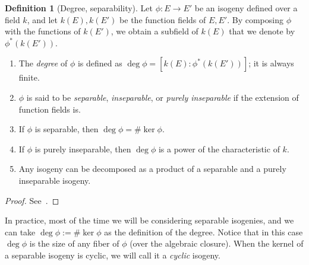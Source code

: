 \documentclass[10pt]{article}
\theoremstyle{plain}
\theoremstyle{definition}
\newtheorem{definition}[theorem]{Definition}
\begin{document}
\begin{definition}[Degree, separability]\label{def:degsep}
  Let $ϕ:E\to E'$ be an isogeny defined over a field $k$, and let
  $k(E),k(E')$ be the function fields of $E,E'$. %
  By composing $\phi$ with the functions of $k(E')$, we obtain a
  subfield of $k(E)$ that we denote by $ϕ^\ast(k(E'))$.

  \begin{enumerate}
  \item The \emph{degree} of $ϕ$ is defined as
    $\deg ϕ = [k(E):ϕ^\ast(k(E'))]$; it is always finite.
  \item $ϕ$ is said to be \emph{separable}, \emph{inseparable}, or
    \emph{purely inseparable} if the extension of function fields is.
  \item If $ϕ$ is separable, then $\deg ϕ = \#\ker ϕ$.
  \item If $ϕ$ is purely inseparable, then $\deg ϕ$ is a power of the
    characteristic of $k$.
  \item Any isogeny can be decomposed as a product of a separable and
    a purely inseparable isogeny.
  \end{enumerate}
\end{definition}
\begin{proof}
  See~\cite[II, Th.~2.4]{silverman:elliptic}.
\end{proof}

In practice, most of the time we will be considering separable
isogenies, and we can take $\deg ϕ := \#\ker ϕ$ as the definition of
the degree. %
Notice that in this case $\deg ϕ$ is the size of any fiber of $ϕ$
(over the algebraic closure). %
When the kernel of a separable isogeny is cyclic, we will call it a
\emph{cyclic} isogeny.
\end{document}
